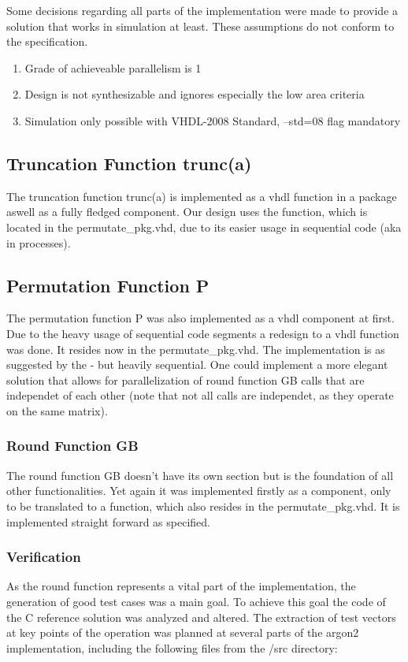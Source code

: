 Some decisions regarding all parts of the implementation were made to provide a
solution that works in simulation at least. These assumptions do not conform to the specification.

\begin{enumerate}
\item Grade of achieveable parallelism is 1
\item Design is not synthesizable and ignores especially the low area criteria
\item Simulation only possible with VHDL-2008 Standard, --std=08 flag mandatory
\end{enumerate}

\subsection{Truncation Function trunc(a)}
The truncation function trunc(a) is implemented as a vhdl function in a package aswell as a
fully fledged component. Our design uses the function, which is located in the
permutate_pkg.vhd, due to its easier usage in sequential code (aka in processes).
\subsection{Permutation Function P}
The permutation function P was also implemented as a vhdl component at first.
Due to the heavy usage of sequential code segments a redesign to a vhdl function was 
done. It resides now in the permutate_pkg.vhd.
The implementation is as suggested by the \autocite{irtf-draft} - but heavily sequential.
One could implement a more elegant solution that allows for parallelization of round
function GB calls that are independet of each other (note that not all calls are
independet, as they operate on the same matrix). 
\subsubsection{Round Function GB}
The round function GB doesn't have its own section but is the foundation of all other
functionalities. 
Yet again it was implemented firstly as a component, only to be translated to a function,
which also resides in the permutate_pkg.vhd. 
It is implemented straight forward as specified.

\subsubsection{Verification}
As the round function represents a vital part of the implementation, the generation of
good test cases was a main goal. To achieve this goal the code of the C reference solution
\autocite{argon2-github}
was analyzed and altered.
The extraction of test vectors at key points of the operation was planned at several parts
of the argon2 implementation, including the following files from the /src directory:

